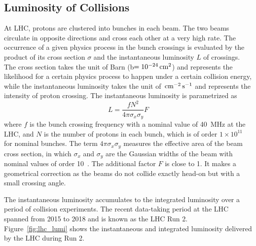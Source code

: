 \subsection{Luminosity of Collisions}\label{sec:lumi}

At LHC, protons are clustered into bunches in each beam.
The two beams circulate in opposite directions and cross each other at a very high rate.
The occurrence of a given physics process in the bunch crossings is evaluated by the product of its cross section $\sigma$ and the instantaneous luminosity $L$ of crossings.
The cross section takes the unit of Barn (b$ = 10^{-24} \,\text{cm}^{2}$) and represents the likelihood for a certain physics process to happen under a certain collision energy,
while the instantaneous luminosity takes the unit of $\,\text{cm}^{-2}\,\text{s}^{-1}$ and represents the intensity of proton crossing.
The instantaneous luminosity is parametrized as 
\begin{equation}\label{eq:luminosity_def}
    L = \frac{fN^{2}}{4\pi\sigma_{x}\sigma_{y}} F
\end{equation}
where $f$ is the bunch crossing frequency with a nominal value of 40~MHz at the LHC,
and $N$ is the number of protons in each bunch, which is of order $1\times10^{11}$ for nominal bunches.
The term $4\pi\sigma_{x}\sigma_{y}$ measures the effective area of the beam cross section, 
in which $\sigma_{x}$ and $\sigma_{y}$ are the Gaussian widths of the beam with nominal values of order 10~\mum.
The additional factor $F$ is close to 1. 
It makes a geometrical correction as the beams do not collide exactly head-on but with a small crossing angle.

The instantaneous luminosity accumulates to the integrated luminosity over a period of collision experiments.
The recent data-taking period at the LHC spanned from 2015 to 2018 and is known as the LHC Run 2.
Figure~\ref{fig:lhc_lumi} shows the instantaneous and integrated luminosity delivered by the LHC during Run 2.

